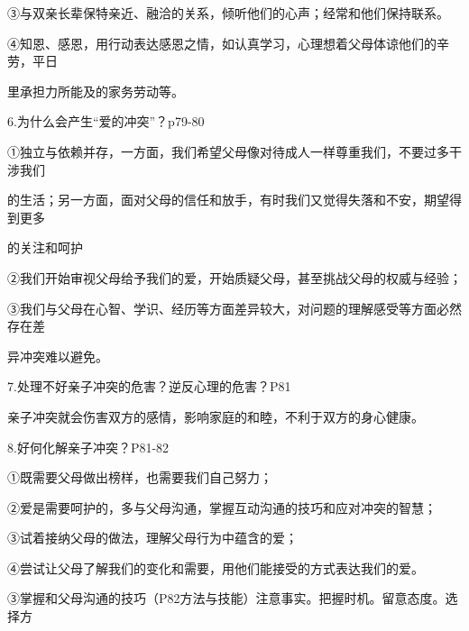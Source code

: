 \documentclass[lang=cn,11pt]{elegantbook}
\newcommand{\daofasym}[1]{{\daofasymbolfont #1}}
\newcommand{\daofasym}[1]{#1}
\begin{document}
\daofasym{③}与双亲长辈保特亲近、融洽的关系，倾听他们的心声；经常和他们保持联系。\par

\daofasym{④}知恩、感恩，用行动表达感恩之情，如认真学习，心理想着父母体谅他们的辛劳，平日\par

里承担力所能及的家务劳动等。\par

6.为什么会产生“爱的冲突”？p79-80\par

\daofasym{①}独立与依赖并存，一方面，我们希望父母像对待成人一样尊重我们，不要过多干涉我们\par

的生活；另一方面，面对父母的信任和放手，有时我们又觉得失落和不安，期望得到更多\par

的关注和呵护\par

\daofasym{②}我们开始审视父母给予我们的爱，开始质疑父母，甚至挑战父母的权威与经验；\par

\daofasym{③}我们与父母在心智、学识、经历等方面差异较大，对问题的理解感受等方面必然存在差\par

异冲突难以避免。\par

7.处理不好亲子冲突的危害？逆反心理的危害？P81\par

亲子冲突就会伤害双方的感情，影响家庭的和睦，不利于双方的身心健康。\par

8.好何化解亲子冲突？P81-82\par

\daofasym{①}既需要父母做出榜样，也需要我们自己努力；\par

\daofasym{②}爱是需要呵护的，多与父母沟通，掌握互动沟通的技巧和应对冲突的智慧；\par

\daofasym{③}试着接纳父母的做法，理解父母行为中蕴含的爱；\par

\daofasym{④}尝试让父母了解我们的变化和需要，用他们能接受的方式表达我们的爱。\par

\daofasym{③}掌握和父母沟通的技巧（P82方法与技能）注意事实。把握时机。留意态度。选择方\par
\end{document}

